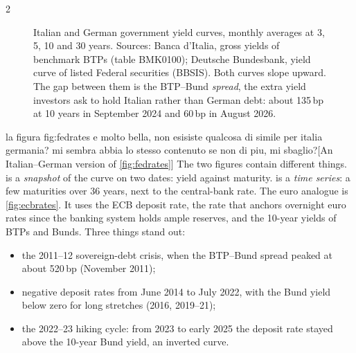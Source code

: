 \begin{paracol}{2}
\begin{figure}[ht]
\centering
{}
\caption{Italian and German government yield curves, monthly averages at 3, 5, 10 and 30 years.
Sources: Banca d'Italia, gross yields of benchmark BTPs (table BMK0100); Deutsche Bundesbank,
yield curve of listed Federal securities (BBSIS). Both curves slope upward. The gap between them
is the BTP--Bund \emph{spread}, the extra yield investors ask to hold Italian rather than German debt:
about 135\,bp at 10 years in September 2024 and 60\,bp in August 2026.}\label{fig:itde}
\end{figure}\begin{answer}{la figura fig:fedrates e molto bella, non esisiste qualcosa di simile per italia germania? mi sembra abbia lo stesso contenuto se non di piu, mi sbaglio?}[An Italian--German version of \cref{fig:fedrates}]
The two figures contain different things.  is a \emph{snapshot} of the curve on two
dates: yield against maturity.  is a \emph{time series}: a few maturities over 36
years, next to the central-bank rate. The euro analogue is \cref{fig:ecbrates}. It uses the ECB
deposit rate, the rate that anchors overnight euro rates since the banking system holds ample
reserves, and the 10-year yields of BTPs and Bunds. Three things stand out:
\begin{itemize}
  \item the 2011--12 sovereign-debt crisis, when the BTP--Bund spread peaked at about 520\,bp (November 2011);
  \item negative deposit rates from June 2014 to July 2022, with the Bund yield below zero for long stretches (2016, 2019--21);
  \item the 2022--23 hiking cycle: from 2023 to early 2025 the deposit rate stayed above the 10-year Bund yield, an inverted curve.
\end{itemize}
\end{answer}


\end{paracol}
